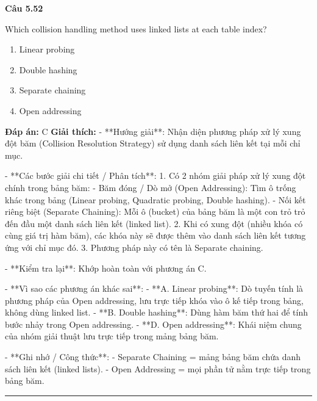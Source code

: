 \documentclass[11pt,a4paper]{article}
\newenvironment{question}[1]{%
  \par\vspace{1em}\noindent\textbf{\large Câu #1}\par\vspace{0.4em}
}{%
  \par\vspace{1em}\hrule\vspace{0.6em}
}
\newenvironment{choices}{%
  \begin{enumerate}[label=\textbf{\Alph*.},leftmargin=2.2em,itemsep=2pt,topsep=3pt]
}{%
  \end{enumerate}
}
\newcommand{\choice}{\item}
\begin{document}
\begin{question}{5.52}
Which collision handling method uses linked lists at each table index?
\begin{choices}
\choice Linear probing
\choice Double hashing
\choice Separate chaining
\choice Open addressing
\end{choices}
\textbf{Đáp án:} C
\textbf{Giải thích:} - **Hướng giải**:
  Nhận diện phương pháp xử lý xung đột băm (Collision Resolution Strategy) sử dụng danh sách liên kết tại mỗi chỉ mục.

- **Các bước giải chi tiết / Phân tích**:
  1. Có 2 nhóm giải pháp xử lý xung đột chính trong bảng băm:
     - Băm đóng / Dò mở (Open Addressing): Tìm ô trống khác trong bảng (Linear probing, Quadratic probing, Double hashing).
     - Nối kết riêng biệt (Separate Chaining): Mỗi ô (bucket) của bảng băm là một con trỏ trỏ đến đầu một danh sách liên kết (linked list).
  2. Khi có xung đột (nhiều khóa có cùng giá trị hàm băm), các khóa này sẽ được thêm vào danh sách liên kết tương ứng với chỉ mục đó.
  3. Phương pháp này có tên là Separate chaining.

- **Kiểm tra lại**:
  Khớp hoàn toàn với phương án C.

- **Vì sao các phương án khác sai**:
  - **A. Linear probing**: Dò tuyến tính là phương pháp của Open addressing, lưu trực tiếp khóa vào ô kế tiếp trong bảng, không dùng linked list.
  - **B. Double hashing**: Dùng hàm băm thứ hai để tính bước nhảy trong Open addressing.
  - **D. Open addressing**: Khái niệm chung của nhóm giải thuật lưu trực tiếp trong mảng bảng băm.

- **Ghi nhớ / Công thức**:
  - Separate Chaining = mảng bảng băm chứa danh sách liên kết (linked lists).
  - Open Addressing = mọi phần tử nằm trực tiếp trong bảng băm.
\end{question}
\end{document}
